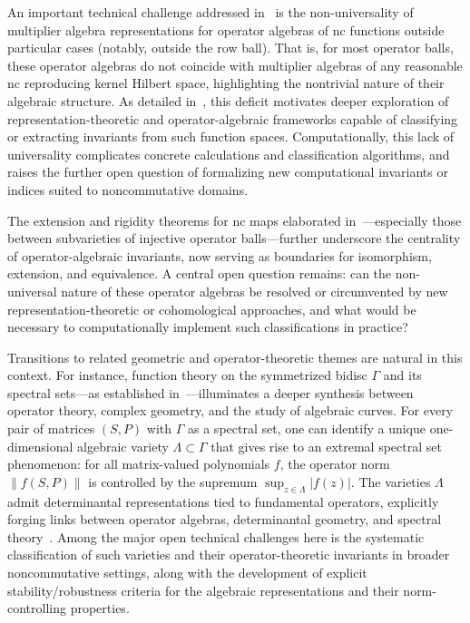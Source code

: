 \documentclass[sigconf]{acmart}
\begin{document}
An important technical challenge addressed in~\cite{ref98} is the non-universality of multiplier algebra representations for operator algebras of nc functions outside particular cases (notably, outside the row ball). That is, for most operator balls, these operator algebras do not coincide with multiplier algebras of any reasonable nc reproducing kernel Hilbert space, highlighting the nontrivial nature of their algebraic structure. As detailed in~\cite{ref98}, this deficit motivates deeper exploration of representation-theoretic and operator-algebraic frameworks capable of classifying or extracting invariants from such function spaces. Computationally, this lack of universality complicates concrete calculations and classification algorithms, and raises the further open question of formalizing new computational invariants or indices suited to noncommutative domains.

The extension and rigidity theorems for nc maps elaborated in~\cite{ref98}---especially those between subvarieties of injective operator balls---further underscore the centrality of operator-algebraic invariants, now serving as boundaries for isomorphism, extension, and equivalence. A central open question remains: can the non-universal nature of these operator algebras be resolved or circumvented by new representation-theoretic or cohomological approaches, and what would be necessary to computationally implement such classifications in practice?

Transitions to related geometric and operator-theoretic themes are natural in this context. For instance, function theory on the symmetrized bidisc $\Gamma$ and its spectral sets---as established in~\cite{ref99}---illuminates a deeper synthesis between operator theory, complex geometry, and the study of algebraic curves. For every pair of matrices $(S, P)$ with $\Gamma$ as a spectral set, one can identify a unique one-dimensional algebraic variety $\Lambda \subset \Gamma$ that gives rise to an extremal spectral set phenomenon: for all matrix-valued polynomials $f$, the operator norm $\|f(S,P)\|$ is controlled by the supremum $\sup_{z \in \Lambda} |f(z)|$. The varieties $\Lambda$ admit determinantal representations tied to fundamental operators, explicitly forging links between operator algebras, determinantal geometry, and spectral theory~\cite{ref99}. Among the major open technical challenges here is the systematic classification of such varieties and their operator-theoretic invariants in broader noncommutative settings, along with the development of explicit stability/robustness criteria for the algebraic representations and their norm-controlling properties.
\end{document}
